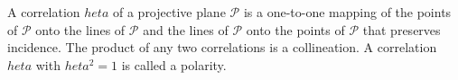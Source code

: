 A correlation $	heta$ of a projective plane $\mathcal{P}$ is a one-to-one mapping of the points of $\mathcal{P}$ onto the lines of $\mathcal{P}$ and the lines of $\mathcal{P}$ onto the points of $\mathcal{P}$ that preserves incidence. The product of any two correlations is a collineation. A correlation $	heta$ with $	heta^2 = 1$ is called a polarity.
